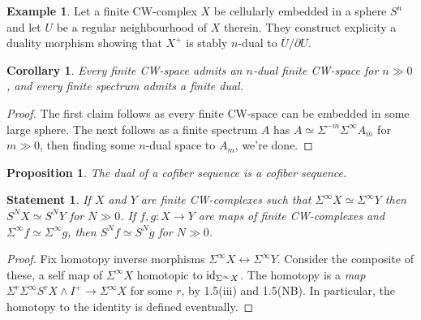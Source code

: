 \documentclass[11pt]{article}
\theoremstyle{plain}
\newtheorem{prop}[thm]{Proposition}
\newtheorem{cor}[thm]{Corollary}
\newtheorem*{statement*}{Statement}
\theoremstyle{definition}
\newtheorem{exmp}[thm]{Example}
\begin{document}
{\begin{exmp}
Let a finite CW-complex $X$ be cellularly embedded in a sphere $S^n$ and let $U$
be a regular neighbourhood of $X$ therein. They construct explicity a duality
morphism showing that $X^+$ is stably $n$-dual to $\overline U/\partial U$.
\end{exmp}
\begin{cor}
Every finite CW-space admits an $n$-dual finite CW-space for $n\gg0$, and every
finite spectrum admits a finite dual.
\end{cor}
\begin{proof}
The first claim follows as every finite CW-space can be embedded in some large
sphere. The next follows as a finite spectrum $A$ has $A\simeq
\Sigma^{-m}\Sigma^\infty A_m$ for $m\gg0$, then finding some $n$-dual space to
$A_m$, we're done.
\end{proof}
\begin{prop}
The dual of a cofiber sequence is a cofiber sequence.
\end{prop}
\begin{statement*}
If $X$ and $Y$ are finite CW-complexes such that 
$\Sigma^\infty X\simeq\Sigma^\infty Y$ then $S^NX\simeq S^NY$ for $N\gg0$.
If $f,g:X\to Y$ are maps of finite CW-complexes and $\Sigma^\infty
f\simeq\Sigma^\infty g$, then $S^Nf\simeq S^Ng$ for $N\gg0$.
\end{statement*}
\begin{proof}
Fix homotopy inverse morphisms $\Sigma^\infty X\longleftrightarrow\Sigma^\infty
Y$. Consider the composite of these, a self map of $\Sigma^\infty X$ homotopic
to $\textup{id}_{\Sigma^{\infty}X}$. The homotopy is a \emph{map}
$\Sigma^r\Sigma^{\infty}S^rX\wedge I^+\to\Sigma^\infty X$ for some $r$, by
1.5(iii) and 1.5(NB). In particular, the homotopy to the identity is defined
eventually.


\end{proof}}
\end{document}
